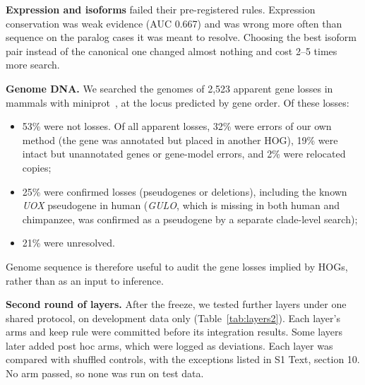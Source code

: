 \documentclass[10pt,letterpaper]{article}
\begin{document}
\textbf{Expression and isoforms} failed their pre-registered rules. Expression conservation was weak evidence (AUC 0.667) and was wrong more often than sequence on the paralog cases it was meant to resolve. Choosing the best isoform pair instead of the canonical one changed almost nothing and cost 2--5 times more search.

\textbf{Genome DNA.} We searched the genomes of 2,523 apparent gene losses in mammals with miniprot~\cite{li2023miniprot}, at the locus predicted by gene order. Of these losses:
\begin{itemize}
\item 53\% were not losses. Of all apparent losses, 32\% were errors of our own method (the gene was annotated but placed in another HOG), 19\% were intact but unannotated genes or gene-model errors, and 2\% were relocated copies;
\item 25\% were confirmed losses (pseudogenes or deletions), including the known \textit{UOX} pseudogene in human (\textit{GULO}, which is missing in both human and chimpanzee, was confirmed as a pseudogene by a separate clade-level search);
\item 21\% were unresolved.
\end{itemize} Genome sequence is therefore useful to audit the gene losses implied by HOGs, rather than as an input to inference.

\textbf{Second round of layers.} After the freeze, we tested further layers under one shared protocol, on development data only (Table~\ref{tab:layers2}). Each layer's arms and keep rule were committed before its integration results. Some layers later added post hoc arms, which were logged as deviations. Each layer was compared with shuffled controls, with the exceptions listed in S1 Text, section 10. No arm passed, so none was run on test data.
\end{document}
